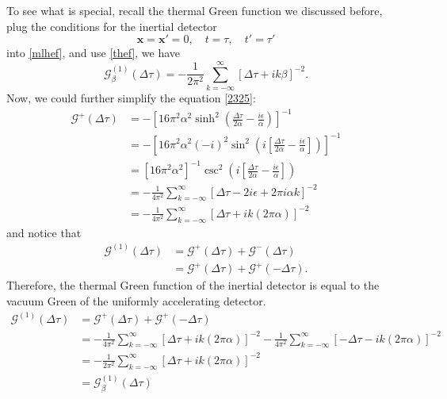 \documentclass[12pt]{article}
\numberwithin{equation}{section}
\theoremstyle{1style}
\begin{document}
To see what is special, recall the thermal Green function we discussed before, plug the conditions for the inertial detector
\begin{equation}
  \mathbf{x}=\mathbf{x'}=0,\quad t=\tau,\quad t'=\tau'
\end{equation}
into \ref{mlhef}, and use \ref{thef}, we have
\begin{equation}
  \mathcal{G}^{(1)}_{\beta}(\Delta\tau)=-\frac{1}{2\pi^2}\sum_{k=-\infty}^{\infty}\left[\Delta\tau+ik\beta\right]^{-2}.
\end{equation}
Now, we could further simplify the equation \ref{2325}:
\begin{align}
  \mathcal{G}^+(\Delta\tau) & =-\left[16\pi^2\alpha^2\sinh^2\left(\frac{\Delta\tau}{2\alpha}-\frac{i\epsilon}{\alpha}\right)\right]^{-1}                    \\
                            & =-\left[16\pi^2\alpha^2(-i)^2\sin^2\left(i\left[\frac{\Delta\tau}{2\alpha}-\frac{i\epsilon}{\alpha}\right]\right)\right]^{-1} \\
                            & =\left[16\pi^2\alpha^2\right]^{-1}\csc^2\left(i\left[\frac{\Delta\tau}{2\alpha}-\frac{i\epsilon}{\alpha}\right]\right)        \\
                            & =-\frac{1}{4\pi^2}\sum_{k=-\infty}^{\infty}\left[\Delta\tau-2i\epsilon+2\pi i\alpha k\right]^{-2}                             \\
                            & =-\frac{1}{4\pi^2}\sum_{k=-\infty}^{\infty}\left[\Delta\tau+ik(2\pi\alpha)\right]^{-2}
\end{align}
and notice that
\begin{align}
  \mathcal{G}^{(1)}(\Delta\tau) & =\mathcal{G}^{+}(\Delta\tau)+\mathcal{G}^{-}(\Delta\tau)   \\
                                & =\mathcal{G}^{+}(\Delta\tau)+\mathcal{G}^{+}(-\Delta\tau).
\end{align}
Therefore, the thermal Green function of the inertial detector is equal to the vacuum Green of the uniformly accelerating detector.
\begin{align}
  \mathcal{G}^{(1)}(\Delta\tau) & =\mathcal{G}^{+}(\Delta\tau)+\mathcal{G}^{+}(-\Delta\tau)                                                                                                                    \\
                                & =-\frac{1}{4\pi^2}\sum_{k=-\infty}^{\infty}\left[\Delta\tau+ik(2\pi\alpha)\right]^{-2}-\frac{1}{4\pi^2}\sum_{k=-\infty}^{\infty}\left[-\Delta\tau-ik(2\pi\alpha)\right]^{-2} \\
                                & =-\frac{1}{2\pi^2}\sum_{k=-\infty}^{\infty}\left[\Delta\tau+ik(2\pi\alpha)\right]^{-2}                                                                                       \\
                                & =\mathcal{G}^{(1)}_{\beta}(\Delta\tau)
\end{align}
\end{document}
